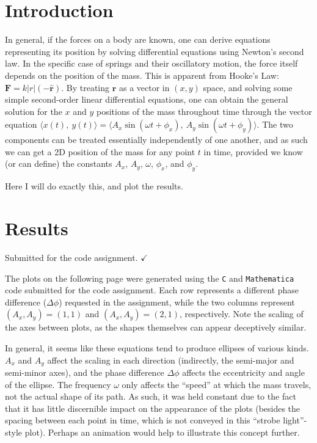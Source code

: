 \documentclass{article}
\author{\hwauthor}
\title{\hwtitle}
\date{\hwdate}
\begin{document}
\maketitle
\thispagestyle{fancy}

\section{Introduction}

In general, if the forces on a body are known, one can derive equations representing its position by solving differential equations using Newton's second law. In the specific case of springs and their oscillatory motion, the force itself depends on the position of the mass. This is apparent from Hooke's Law: $\mathbf{F} = k|r|(-\hat{\mathbf{r}})$. By treating $\mathbf{r}$ as a vector in $(x,y)$ space, and solving some simple second-order linear differential equations, one can obtain the general solution for the $x$ and $y$ positions of the mass throughout time through the vector equation $\displaystyle \langle x(t),\ y(t)\rangle  = \langle A_x\sin(\omega t +\phi_x),\ A_y\sin(\omega t + \phi_y)\rangle$. The two components can be treated essentially independently of one another, and as such we can get a 2D position of the mass for any point $t$ in time, provided we know (or can define) the constants $A_x$, $A_y$, $\omega$, $\phi_x$, and $\phi_y$.

Here I will do exactly this, and plot the results.

\section{Results}

\bigskip
{}
\medskip

Submitted for the code assignment. $\checkmark$

\bigskip
{}
\medskip

The plots on the following page were generated using the \texttt{C} and \texttt{Mathematica} code submitted for the code assignment. Each row represents a different phase difference ($\Delta\phi$) requested in the assignment, while the two columns represent $(A_x,A_y)=(1,1)$ and $(A_x,A_y)=(2,1)$, respectively. Note the scaling of the axes between plots, as the shapes themselves can appear deceptively similar.

\bigskip
{}
\medskip

In general, it seems like these equations tend to produce ellipses of various kinds. $A_x$ and $A_y$ affect the scaling in each direction (indirectly, the semi-major and semi-minor axes), and the phase difference $\Delta\phi$ affects the eccentricity and angle of the ellipse. The frequency $\omega$ only affects the ``speed'' at which the mass travels, not the actual shape of its path. As such, it was held constant due to the fact that it has little discernible impact on the appearance of the plots (besides the spacing between each point in time, which is not conveyed in this ``strobe light''-style plot). Perhaps an animation would help to illustrate this concept further.
\end{document}
